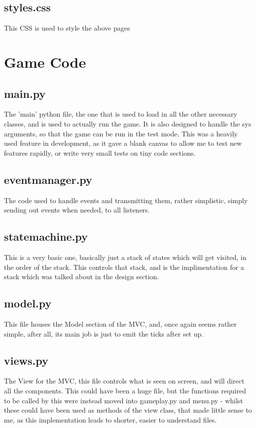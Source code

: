 \subsection{styles.css}
This CSS is used to style the above pages



\section{Game Code}

\subsection{main.py}
The 'main' python file, the one that is used to load in all the other necessary classes, and is used to actually run the game. It is also designed to handle the sys arguments, so that the game can be run in the test mode. This was a heavily used feature in development, as it gave a blank canvas to allow me to test new features rapidly, or write very small tests on tiny code sections.


\subsection{eventmanager.py}
The code used to handle events and transmitting them, rather simplistic, simply sending out events when needed, to all listeners.


\subsection{statemachine.py}
This is a very basic one, basically just a stack of states which will get visited, in the order of the stack. This controls that stack, and is the implimentation for a stack which was talked about in the design section.


\subsection{model.py}
This file houses the Model section of the MVC, and, once again seems rather simple, after all, its main job is just to emit the ticks after set up.


\subsection{views.py}
The View for the MVC, this file controls what is seen on screen, and will direct all the components. This could have been a huge file, but the functions required to be called by this were instead moved into gameplay.py and menu.py - whilst these could have been used as methods of the view class, that made little sense to me, as this implementation leads to shorter, easier to understand files.


